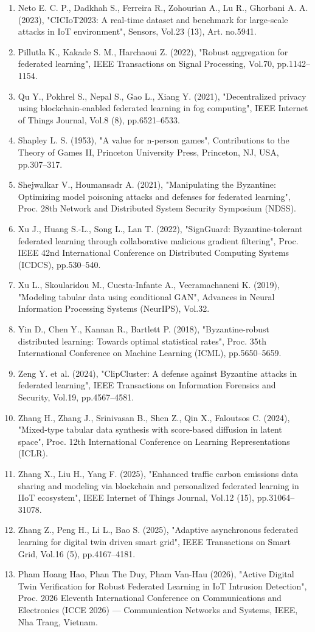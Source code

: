 \begin{enumerate}
\item
  Neto E. C. P., Dadkhah S., Ferreira R., Zohourian A., Lu R., Ghorbani A. A. (2023), "CICIoT2023: A real-time dataset and benchmark for large-scale attacks in IoT environment", Sensors, Vol.23 (13), Art. no.5941.
\item
  Pillutla K., Kakade S. M., Harchaoui Z. (2022), "Robust aggregation for federated learning", IEEE Transactions on Signal Processing, Vol.70, pp.1142--1154.
\item
  Qu Y., Pokhrel S., Nepal S., Gao L., Xiang Y. (2021), "Decentralized privacy using blockchain-enabled federated learning in fog computing", IEEE Internet of Things Journal, Vol.8 (8), pp.6521--6533.
\item
  Shapley L. S. (1953), "A value for n-person games", Contributions to the Theory of Games II, Princeton University Press, Princeton, NJ, USA, pp.307--317.
\item
  Shejwalkar V., Houmansadr A. (2021), "Manipulating the Byzantine: Optimizing model poisoning attacks and defenses for federated learning", Proc. 28th Network and Distributed System Security Symposium (NDSS).
\item
  Xu J., Huang S.-L., Song L., Lan T. (2022), "SignGuard: Byzantine-tolerant federated learning through collaborative malicious gradient filtering", Proc. IEEE 42nd International Conference on Distributed Computing Systems (ICDCS), pp.530--540.
\item
  Xu L., Skoularidou M., Cuesta-Infante A., Veeramachaneni K. (2019), "Modeling tabular data using conditional GAN", Advances in Neural Information Processing Systems (NeurIPS), Vol.32.
\item
  Yin D., Chen Y., Kannan R., Bartlett P. (2018), "Byzantine-robust distributed learning: Towards optimal statistical rates", Proc. 35th International Conference on Machine Learning (ICML), pp.5650--5659.
\item
  Zeng Y. et al. (2024), "ClipCluster: A defense against Byzantine attacks in federated learning", IEEE Transactions on Information Forensics and Security, Vol.19, pp.4567--4581.
\item
  Zhang H., Zhang J., Srinivasan B., Shen Z., Qin X., Faloutsos C. (2024), "Mixed-type tabular data synthesis with score-based diffusion in latent space", Proc. 12th International Conference on Learning Representations (ICLR).
\item
  Zhang X., Liu H., Yang F. (2025), "Enhanced traffic carbon emissions data sharing and modeling via blockchain and personalized federated learning in IIoT ecosystem", IEEE Internet of Things Journal, Vol.12 (15), pp.31064--31078.
\item
  Zhang Z., Peng H., Li L., Bao S. (2025), "Adaptive asynchronous federated learning for digital twin driven smart grid", IEEE Transactions on Smart Grid, Vol.16 (5), pp.4167--4181.
\item
  Pham Hoang Hao, Phan The Duy, Pham Van-Hau (2026), "Active Digital Twin Verification for Robust Federated Learning in IoT Intrusion Detection", Proc. 2026 Eleventh International Conference on Communications and Electronics (ICCE 2026) --- Communication Networks and Systems, IEEE, Nha Trang, Vietnam.
\end{enumerate}
